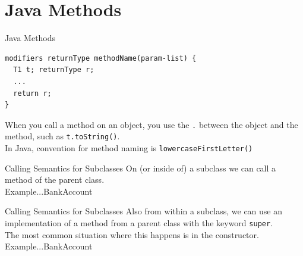 \documentclass{beamer}
\begin{document}
\section{Java Methods}



\begin{frame}[fragile]{Java Methods}
\begin{verbatim}
modifiers returnType methodName(param-list) {
  T1 t; returnType r;
  ...
  return r;
}
\end{verbatim}

When you call a method on an object, you use the \texttt{.} between the object and the method, such as \texttt{t.toString()}. \\
\vspace{0.5em}
In Java, convention for method naming is {\tt lowercaseFirstLetter()}

\end{frame}



\begin{frame}[fragile]{Calling Semantics for Subclasses}
On (or inside of) a subclass we can call a method of the parent class. \\
\vspace{1em}
Example...BankAccount \\
\end{frame}



\begin{frame}[fragile]{Calling Semantics for Subclasses}
Also from within a subclass, we can use an implementation of a method from a parent class with the keyword \texttt{super}. \\
\vspace{1em}
The most common situation where this happens is in the constructor. \\
\vspace{1em}
Example...BankAccount \\
\end{frame}
\end{document}
